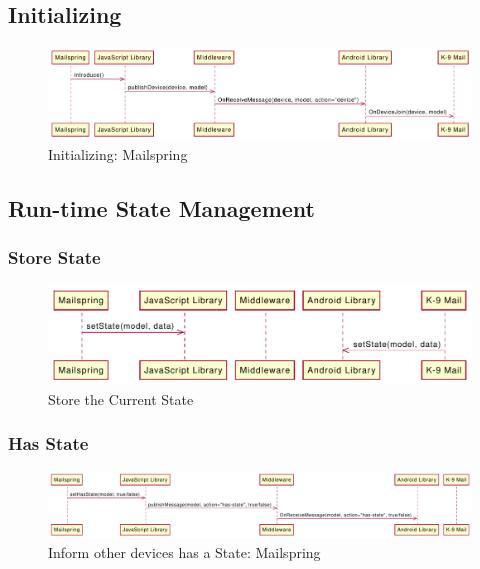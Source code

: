 \subsection{Initializing}
\begin{figure}
    \includegraphics[width=\linewidth]{../figures/Initializing-Mailspring}
    \centering
    \caption{Initializing: Mailspring}
    \label{fig:Initializing-Mailspring}
\end{figure}

\subsection{Run-time State Management}
\subsubsection{Store State}
\begin{figure}
    \includegraphics[width=\linewidth]{../figures/Store-Current-State}
    \centering
    \caption{Store the Current State}
    \label{fig:Store-Current-State}
\end{figure}
\subsubsection{Has State}
\begin{figure}
    \includegraphics[width=\linewidth]{../figures/Inform-Devices-Has-State-Mailspring}
    \centering
    \caption{Inform other devices has a State: Mailspring}
    \label{fig:Inform-Devices-Has-State-Mailspring}
\end{figure}

